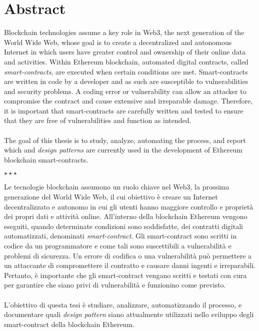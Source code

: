 \chapter*{Abstract}\label{abstract}
Blockchain technologies assume a key role in Web3, the next generation of the World Wide Web, whose goal is to create a decentralized and autonomous Internet in which users have greater control and ownership of their online data and activities. Within Ethereum blockchain, automated digital contracts, called \textit{smart-contracts}, are executed when certain conditions are met. Smart-contracts are written in code by a developer and as such are susceptible to vulnerabilities and security problems. A coding error or vulnerability can allow an attacker to compromise the contract and cause extensive and irreparable damage. Therefore, it is important that smart-contracts are carefully written and tested to ensure that they are free of vulnerabilities and function as intended.\\
\\
The goal of this thesis is to study, analyze, automating the process, and report which and \textit{design patterns} are currently used in the development of Ethereum blockchain smart-contracts.
\vspace{40pt}
\begin{center}
\large$\star\star\star$
\end{center}
\vspace{40pt}
Le tecnologie blockchain assumono un ruolo chiave nel Web3, la prossima generazione del World Wide Web, il cui obiettivo è creare un Internet decentralizzato e autonomo in cui gli utenti hanno maggiore controllo e proprietà dei propri dati e attività online. All'interno della blockchain Ethereum vengono eseguiti, quando determinate condizioni sono soddisfatte, dei contratti digitali automatizzati, denominati \textit{smart-contract}. Gli smart-contract sono scritti in codice da un programmatore e come tali sono suscettibili a vulnerabilità e problemi di sicurezza. Un errore di codifica o una vulnerabilità può permettere a un attaccante di compromettere il contratto e causare danni ingenti e irreparabili. Pertanto, è importante che gli smart-contract vengano scritti e testati con cura per garantire che siano privi di vulnerabilità e funzionino come previsto.\\
\\
L'obiettivo di questa tesi è studiare, analizzare, automatizzando il processo, e documentare quali \textit{design pattern} siano attualmente utilizzati nello sviluppo degli smart-contract della blockchain Ethereum.
 

